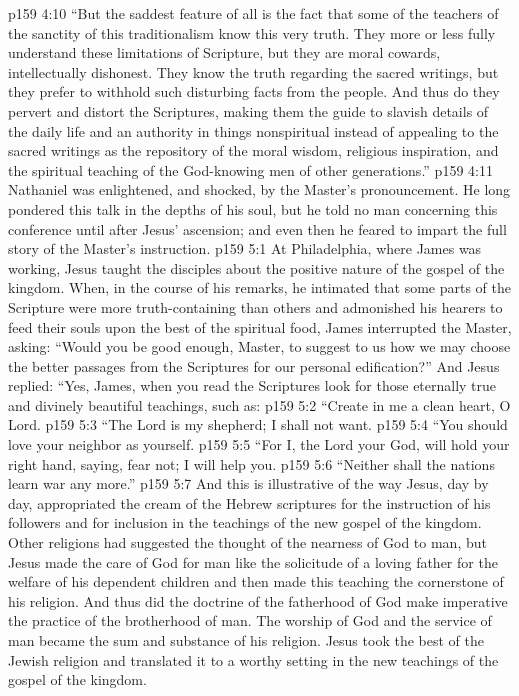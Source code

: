 \vs p159 4:10 \textcolor{ubdarkred}{“But the saddest feature of all is the fact that some of the teachers of the sanctity of this traditionalism know this very truth. They more or less fully understand these limitations of Scripture, but they are moral cowards, intellectually dishonest. They know the truth regarding the sacred writings, but they prefer to withhold such disturbing facts from the people. And thus do they pervert and distort the Scriptures, making them the guide to slavish details of the daily life and an authority in things nonspiritual instead of appealing to the sacred writings as the repository of the moral wisdom, religious inspiration, and the spiritual teaching of the God\hyp{}knowing men of other generations.”}
\vs p159 4:11 \pc Nathaniel was enlightened, and shocked, by the Master’s pronouncement. He long pondered this talk in the depths of his soul, but he told no man concerning this conference until after Jesus’ ascension; and even then he feared to impart the full story of the Master’s instruction.
\vs p159 5:1 At Philadelphia, where James was working, Jesus taught the disciples about the positive nature of the gospel of the kingdom. When, in the course of his remarks, he intimated that some parts of the Scripture were more truth\hyp{}containing than others and admonished his hearers to feed their souls upon the best of the spiritual food, James interrupted the Master, asking: “Would you be good enough, Master, to suggest to us how we may choose the better passages from the Scriptures for our personal edification?” And Jesus replied: \textcolor{ubdarkred}{“Yes, James, when you read the Scriptures look for those eternally true and divinely beautiful teachings, such as:}
\vs p159 5:2 \textcolor{ubdarkred}{“Create in me a clean heart, O Lord.}
\vs p159 5:3 \pc \textcolor{ubdarkred}{“The Lord is my shepherd; I shall not want.}
\vs p159 5:4 \pc \textcolor{ubdarkred}{“You should love your neighbor as yourself.}
\vs p159 5:5 \pc \textcolor{ubdarkred}{“For I, the Lord your God, will hold your right hand, saying, fear not; I will help you.}
\vs p159 5:6 \pc \textcolor{ubdarkred}{“Neither shall the nations learn war any more.”}
\vs p159 5:7 \pc And this is illustrative of the way Jesus, day by day, appropriated the cream of the Hebrew scriptures for the instruction of his followers and for inclusion in the teachings of the new gospel of the kingdom. Other religions had suggested the thought of the nearness of God to man, but Jesus made the care of God for man like the solicitude of a loving father for the welfare of his dependent children and then made this teaching the cornerstone of his religion. And thus did the doctrine of the fatherhood of God make imperative the practice of the brotherhood of man. The worship of God and the service of man became the sum and substance of his religion. Jesus took the best of the Jewish religion and translated it to a worthy setting in the new teachings of the gospel of the kingdom.
